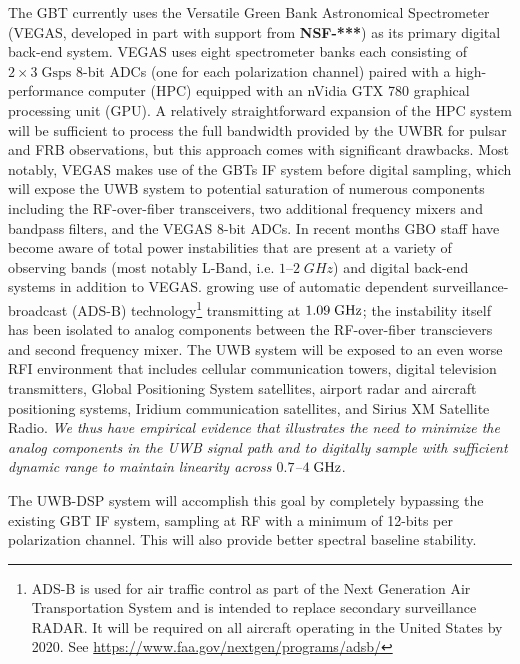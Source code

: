 \documentclass[10pt]{myNSF}
\begin{document}
 The GBT currently uses the Versatile
Green Bank Astronomical Spectrometer (VEGAS, developed in part with
support from \textbf{NSF-***}) as its primary digital back-end system.
VEGAS uses eight spectrometer banks each consisting of $2 \times 3\;
\mathrm{Gsps}$ 8-bit ADCs (one for each polarization channel) paired
with a high-performance computer (HPC) equipped with an nVidia GTX 780
graphical processing unit (GPU).  A relatively straightforward
expansion of the HPC system will be sufficient to process the full
bandwidth provided by the UWBR for pulsar and FRB observations, but
this approach comes with significant drawbacks.  Most notably, VEGAS
makes use of the GBTs IF system before digital sampling, which will
expose the UWB system to potential saturation of numerous components
including the RF-over-fiber transceivers, two additional frequency
mixers and bandpass filters, and the VEGAS 8-bit ADCs.  In recent
months GBO staff have become aware of total power instabilities that
are present at a variety of observing bands (most notably L-Band,
i.e. $1$--$2\; GHz$) and digital back-end systems in addition to
VEGAS.  growing use of automatic dependent surveillance-broadcast
(ADS-B) technology\footnote{ADS-B is used for air traffic control as
  part of the Next Generation Air Transportation System and is
  intended to replace secondary surveillance RADAR.  It will be
  required on all aircraft operating in the United States by 2020.
  See \url{https://www.faa.gov/nextgen/programs/adsb/}} transmitting
at $1.09\; \textrm{GHz}$; the instability itself has been isolated to analog
components between the RF-over-fiber transcievers and second frequency
mixer.  The UWB system will be exposed to an even worse RFI
environment that includes cellular communication towers, digital
television transmitters, Global Positioning System satellites, airport
radar and aircraft positioning systems, Iridium communication
satellites, and Sirius XM Satellite Radio.  \emph{We thus have
  empirical evidence that illustrates the need to minimize the analog
  components in the UWB signal path and to digitally sample with
  sufficient dynamic range to maintain linearity across $0.7$--$4\;
  \textrm{GHz}$}.

The UWB-DSP system will accomplish this goal by completely bypassing
the existing GBT IF system, sampling at RF with a minimum of 12-bits
per polarization channel.  This will also provide better spectral
baseline stability.
\end{document}

